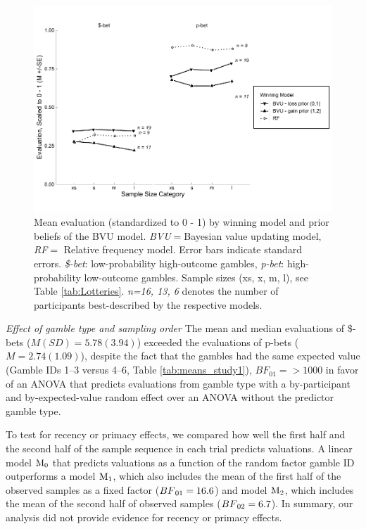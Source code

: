 \documentclass[a4paper, man, floatsintext]{apa6}
\begin{document}
\begin{figure}[htb]

{\centering \includegraphics{../figures/qual1-1} 

}

\caption{Mean evaluation (standardized to 0 - 1) by winning model and prior beliefs of the BVU model. \textit{BVU}$=$Bayesian value updating model, \textit{RF}$=$ Relative frequency model. Error bars indicate standard errors. \textit{\$-bet}: low-probability high-outcome gambles, \textit{p-bet}: high-probability low-outcome gambles. Sample sizes (xs, x, m, l), see Table \ref{tab:Lotteries}. \textit{n=16, 13, 6} denotes the number of participants best-described by the respective models.}\label{fig:qual1}
\end{figure}

\textit{Effect of gamble type and sampling order} The mean and median
evaluations of \$-bets (\(M (SD) = 5.78 (3.94)\)) exceeded the
evaluations of p-bets (\(M = 2.74 (1.09)\)), despite the fact that the
gambles had the same expected value (Gamble IDs 1--3 versus 4--6, Table
\ref{tab:means_study1}), \(BF_{\text{01}}=> 1000\) in favor of an ANOVA
that predicts evaluations from gamble type with a by-participant and
by-expected-value random effect over an ANOVA without the predictor
gamble type.

To test for recency or primacy effects, we compared how well the first
half and the second half of the sample sequence in each trial predicts
valuations. A linear model \(\mathrm{M}\textsubscript{0}\) that predicts
valuations as a function of the random factor gamble ID outperforms a
model \(\mathrm{M}\textsubscript{1}\), which also includes the mean of
the first half of the observed samples as a fixed factor
(\(BF\textsubscript{01} = 16.6\)) and model
\(\mathrm{M}\textsubscript{2}\), which includes the mean of the second
half of observed samples (\(BF\textsubscript{02} = 6.7\)). In summary,
our analysis did not provide evidence for recency or primacy effects.
\end{document}
